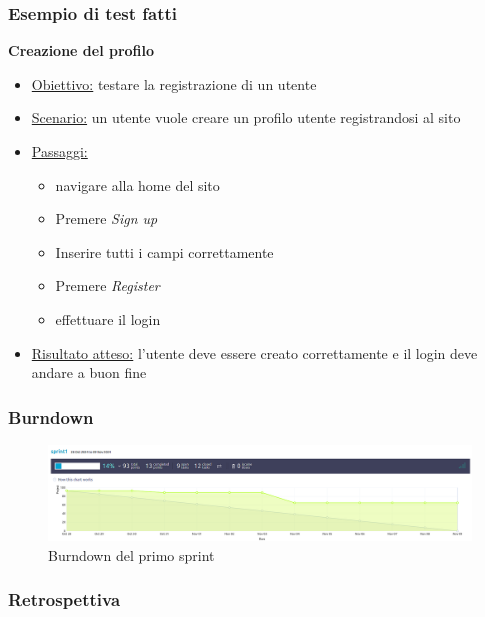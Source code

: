 \documentclass{article}
\begin{document}
\subsubsection{Esempio di test fatti}

\textbf{Creazione del profilo}
\begin{itemize}
    \item \underline{Obiettivo:} testare la registrazione di un utente
    \item \underline{Scenario:} un utente vuole creare un profilo utente registrandosi al sito
    \item \underline{Passaggi:}
    \begin{itemize}
        \item navigare alla home del sito
        \item Premere \textit{Sign up}
        \item Inserire tutti i campi correttamente
        \item Premere \textit{Register}
        \item effettuare il login
    \end{itemize}
    \item \underline{Risultato atteso:} l'utente deve essere creato correttamente e il login deve andare a buon fine
\end{itemize}

\subsubsection{Burndown}
\begin{figure}[H]
    \centering
    \includegraphics[width=1\textwidth]{burndown1}
    \caption{Burndown del primo sprint}
    \label{fig:burndown1}
\end{figure}

\subsubsection{Retrospettiva}
\end{document}
